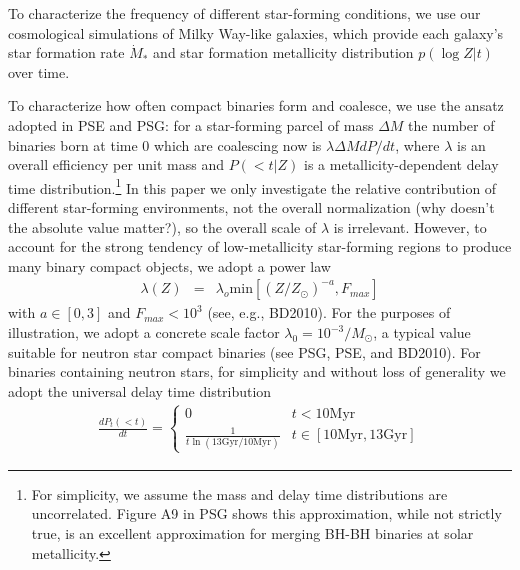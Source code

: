 \documentclass[nofootinbib,twocolumn,prd]{emulateapj}
\newcommand\jillianremark[1]{{\color{blue}#1}}
\newcommand\unit[1]{\text{#1}}
\newcommand\abbrvPSgrb{PSG}
\newcommand\abbrvPSellipticals{PSE}
\newcommand\abbrvKBLowZa{BD2010}
\begin{document}
To characterize the frequency of different star-forming conditions, we use our cosmological simulations of Milky Way-like galaxies, which provide each galaxy's star formation rate
$\dot{M}_*$ and star formation metallicity distribution $p(\log Z|t)$ over time.

To characterize how often compact binaries form and coalesce, we use the ansatz adopted in \abbrvPSellipticals{} and
\abbrvPSgrb{}: for a star-forming parcel of mass $\Delta M$ the number of binaries born at time $0$ which
are coalescing now is $\lambda \Delta M dP/dt$, where $\lambda$ is an overall efficiency per unit mass and $P(<t|Z)$ is
a metallicity-dependent delay time distribution.\footnote{For simplicity, we assume the mass and delay time
  distributions are uncorrelated.  Figure A9 in \abbrvPSgrb{} shows this approximation, while not strictly true, is an
  excellent approximation for merging BH-BH binaries at solar metallicity.  }
    In this paper we only investigate the relative contribution of
different star-forming environments, not the overall normalization \jillianremark{(why doesn't the absolute value matter?)}, so the overall scale of $\lambda$ is irrelevant.  
However, to account for the strong tendency of low-metallicity star-forming regions to produce many binary compact
objects, we adopt a power law
\begin{eqnarray}
\label{eq:LambdaVersusZModel}
\lambda(Z) &=& \lambda_o \text{min}[(Z/Z_\odot)^{-a}, F_{max}] 
\end{eqnarray}
with $a\in [0,3]$ and $F_{max}<10^3$
 (see, e.g.\cite{popsyn-LIGO-SFR-2008}, \abbrvKBLowZa).  For the purposes of illustration, we adopt a  concrete scale
factor  $
\lambda_0 = 10^{-3}/M_\odot $,  a typical value suitable for neutron star compact binaries (see \abbrvPSgrb{}, \abbrvPSellipticals, and \abbrvKBLowZa).
%
For binaries containing neutron stars, for simplicity and without loss of generality we adopt the universal delay time distribution
\begin{eqnarray}
\frac{dP_t(<t)}{dt} =  \begin{cases}
0 & t<10 \unit{Myr} \\
\frac{1}{t \ln (13 \unit{Gyr}/10\unit{Myr})} & t \in [10\unit{Myr},13\unit{Gyr}]
\end{cases} 
\end{eqnarray}
\end{document}
